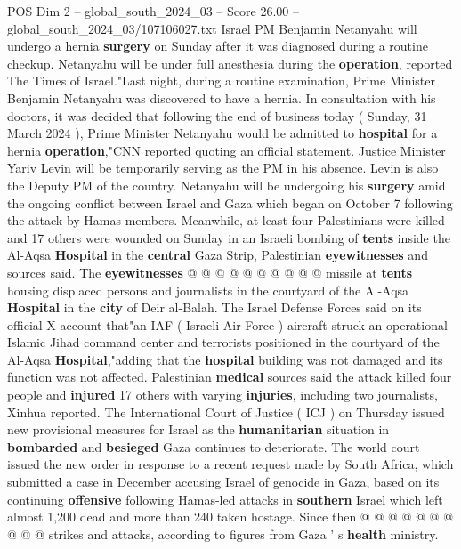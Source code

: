 \begin{textsample}{POS Dim 2 – global\_south\_2024\_03 – Score 26.00 – global\_south\_2024\_03/107106027.txt}  \label{ex:f2_pos_012}
Israel PM Benjamin Netanyahu will undergo a hernia \textbf{surgery} on Sunday after it was diagnosed during a routine checkup.
Netanyahu will be under full anesthesia during the \textbf{operation}, reported The Times of Israel."Last night, during a routine examination, Prime Minister Benjamin Netanyahu was discovered to have a hernia.
In consultation with his doctors, it was decided that following the end of business today ( Sunday, 31 March 2024 ), Prime Minister Netanyahu would be admitted to \textbf{hospital} for a hernia \textbf{operation},"CNN reported quoting an official statement.
Justice Minister Yariv Levin will be temporarily serving as the PM in his absence.
Levin is also the Deputy PM of the country.
Netanyahu will be undergoing his \textbf{surgery} amid the ongoing conflict between Israel and Gaza which began on October 7 following the attack by Hamas members.
Meanwhile, at least four Palestinians were killed and 17 others were wounded on Sunday in an Israeli bombing of \textbf{tents} inside the Al-Aqsa \textbf{Hospital} in the \textbf{central} Gaza Strip, Palestinian \textbf{eyewitnesses} and sources said.
The \textbf{eyewitnesses} @ @ @ @ @ @ @ @ @ @ missile at \textbf{tents} housing displaced persons and journalists in the courtyard of the Al-Aqsa \textbf{Hospital} in the \textbf{city} of Deir al-Balah.
The Israel Defense Forces said on its official X account that"an IAF ( Israeli Air Force ) aircraft struck an operational Islamic Jihad command center and terrorists positioned in the courtyard of the Al-Aqsa \textbf{Hospital},"adding that the \textbf{hospital} building was not damaged and its function was not affected.
Palestinian \textbf{medical} sources said the attack killed four people and \textbf{injured} 17 others with varying \textbf{injuries}, including two journalists, Xinhua reported.
The International Court of Justice ( ICJ ) on Thursday issued new provisional measures for Israel as the \textbf{humanitarian} situation in \textbf{bombarded} and \textbf{besieged} Gaza continues to deteriorate.
The world court issued the new order in response to a recent request made by South Africa, which submitted a case in December accusing Israel of genocide in Gaza, based on its continuing \textbf{offensive} following Hamas-led attacks in \textbf{southern} Israel which left almost 1,200 dead and more than 240 taken hostage.
Since then @ @ @ @ @ @ @ @ @ @ strikes and attacks, according to figures from Gaza ' s \textbf{health} ministry.

\end{textsample}
